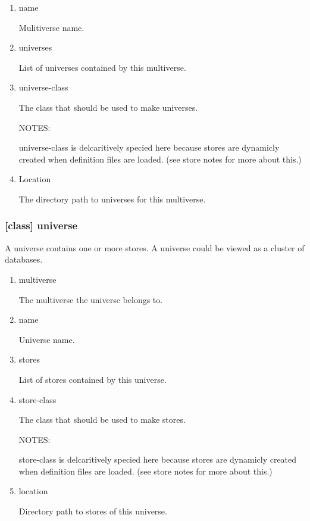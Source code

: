 \documentclass[11pt]{article}
\begin{document}
\begin{enumerate}
\item\relax [accessor] name
\label{sec:org642d973}

Mulitiverse name.

\item\relax [accessor] universes
\label{sec:orgc50443d}

List of universes contained by this multiverse.

\item\relax [accessor] universe-class
\label{sec:orgaf46fdb}

The class that should be used to make universes.

NOTES:

universe-class is delcaritively specied here because stores are
dynamicly created when definition files are loaded. (see store notes
for more about this.)

\item\relax [accessor] Location
\label{sec:orgcefa151}

The directory path to universes for this multiverse.
\end{enumerate}

\subsubsection{[class] universe}
\label{sec:org842eb8c}

A universe contains one or more stores. A universe could be viewed as
a cluster of databases.

\begin{enumerate}
\item\relax [accessor] multiverse
\label{sec:orge91f759}

The multiverse the universe belongs to.

\item\relax [accessor] name
\label{sec:org24ff82b}

Universe name.

\item\relax [accessor] stores
\label{sec:org9322395}

List of stores contained by this universe.

\item\relax [accessor] store-class
\label{sec:orgc1ca6b4}

The class that should be used to make stores.

NOTES:

store-class is delcaritively specied here because stores are dynamicly
created when definition files are loaded. (see store notes for more
about this.)

\item\relax [accessor] location
\label{sec:org9f1ce1d}

Directory path to stores of this universe.
\end{enumerate}
\end{document}
